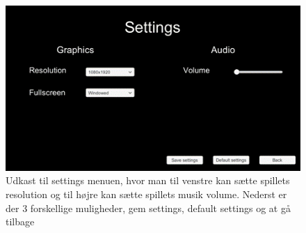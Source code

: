 \begin{figure}[H]
\centering
\includegraphics[width = \textwidth]{02-Body/Images/SettingsMenu-udkast.png}
\caption{Udkast til settings menuen, hvor man til venstre kan sætte spillets resolution og til højre kan sætte spillets musik volume.
Nederst er der 3 forskellige muligheder, gem settings, default settings og at gå tilbage}
\label{fig:Settings-udkast}
\end{figure}
